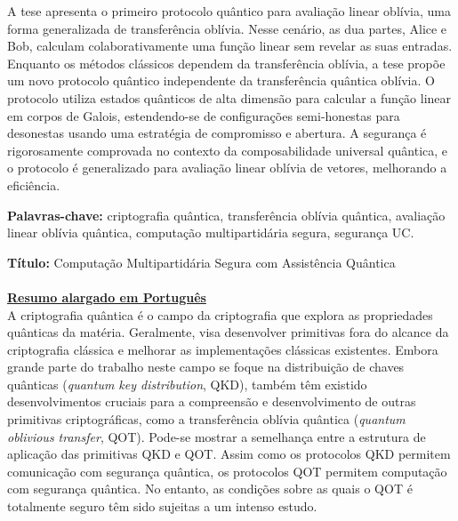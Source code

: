 \documentclass[12pt]{report}
\begin{document}
A tese apresenta o primeiro protocolo quântico para avaliação linear oblívia, uma forma generalizada de transferência oblívia. Nesse cenário, as dua partes, Alice e Bob, calculam colaborativamente uma função linear sem revelar as suas entradas. Enquanto os métodos clássicos dependem da transferência oblívia, a tese propõe um novo protocolo quântico independente da transferência quântica oblívia. O protocolo utiliza estados quânticos de alta dimensão para calcular a função linear em corpos de Galois, estendendo-se de configurações semi-honestas para desonestas usando uma estratégia de compromisso e abertura. A segurança é rigorosamente comprovada no contexto da composabilidade universal quântica, e o protocolo é generalizado para avaliação linear oblívia de vetores, melhorando a eficiência.

\vfill
\begin{flushleft}
\textbf{Palavras-chave:} criptografia qu\^{a}ntica, transferência oblívia quântica, avaliação linear oblívia quântica, computação multipartidária segura, segurança UC.
\end{flushleft}


\newpage


\noindent\textbf{T\'itulo:} Computa\c{c}\~{a}o Multipartid\'{a}ria Segura com Assist\^{e}ncia Qu\^{a}ntica\\\\

\noindent\underline{\textbf{Resumo alargado em Portugu\^{e}s}}\\

A criptografia quântica é o campo da criptografia que explora as propriedades quânticas da matéria. Geralmente, visa desenvolver primitivas fora do alcance da criptografia clássica e melhorar as implementações clássicas existentes. Embora grande parte do trabalho neste campo se foque na distribuição de chaves quânticas (\textit{quantum key distribution}, QKD), também têm existido desenvolvimentos cruciais para a compreensão e desenvolvimento de outras primitivas criptográficas, como a transferência oblívia quântica (\textit{quantum oblivious transfer}, QOT). Pode-se mostrar a semelhança entre a estrutura de aplicação das primitivas QKD e QOT. Assim como os protocolos QKD permitem comunicação com segurança quântica, os protocolos QOT permitem computação com segurança quântica. No entanto, as condições sobre as quais o QOT é totalmente seguro têm sido sujeitas a um intenso estudo. 
\end{document}
